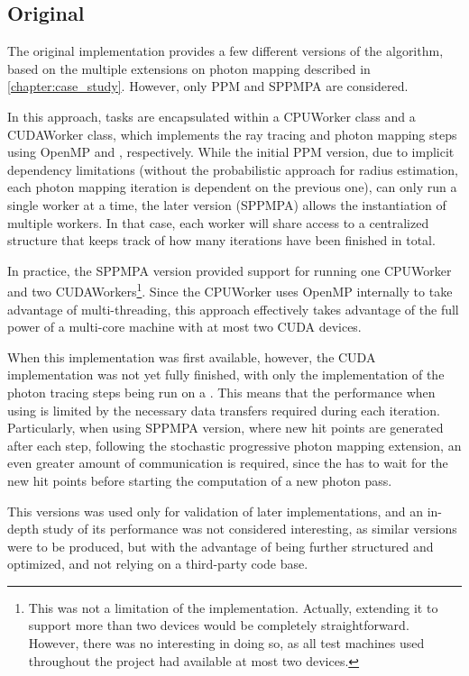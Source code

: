\documentclass[main.tex]{subfiles}
\begin{document}
\subsection{Original} \label{section:impl_original}

The original implementation provides a few different versions of the algorithm, based on the multiple extensions on photon mapping described in \cref{chapter:case_study}. However, only PPM and SPPMPA are considered.

In this approach, tasks are encapsulated within a CPUWorker class and a CUDAWorker class, which implements the ray tracing and photon mapping steps using \acs{OpenMP} and \cuda, respectively. While the initial PPM version, due to implicit dependency limitations (without the probabilistic approach for radius estimation, each photon mapping iteration is dependent on the previous one), can only run a single worker at a time, the later version (SPPMPA) allows the instantiation of multiple workers. In that case, each worker will share access to a centralized structure that keeps track of how many iterations have been finished in total.

In practice, the SPPMPA version provided support for running one CPUWorker and two CUDAWorkers\footnote{This was not a limitation of the implementation. Actually, extending it to support more than two \cuda devices would be completely straightforward. However, there was no interesting in doing so, as all test machines used throughout the project had available at most two \cuda devices.}. Since the CPUWorker uses \acs{OpenMP} internally to take advantage of multi-threading, this approach effectively takes advantage of the full power of a multi-core machine with at most two \acs{CUDA} devices.

When this implementation was first available, however, the \acs{CUDA} implementation was not yet fully finished, with only the implementation of the photon tracing steps being run on a \gpu. This means that the performance when using \cuda is limited by the necessary data transfers required during each iteration. Particularly, when using SPPMPA version, where new hit points are generated after each step, following the stochastic progressive photon mapping extension, an even greater amount of communication is required, since the \gpu has to wait for the new hit points before starting the computation of a new photon pass.

This versions was used only for validation of later implementations, and an in-depth study of its performance was not considered interesting, as similar versions were to be produced, but with the advantage of being further structured and optimized, and not relying on a third-party code base.
\end{document}

